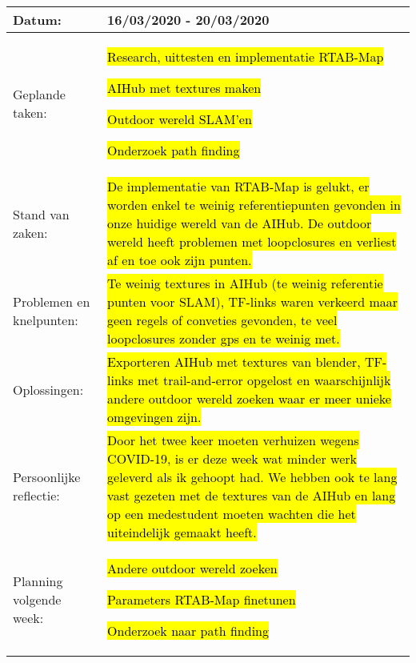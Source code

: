 \begin{tabularx}{\textwidth}{| l | X |}
  \hline
  Datum: & 16/03/2020 - 20/03/2020\\
  \hline
  Geplande taken: &
  \begin{compactitem}
    \item \hl{Research, uittesten en implementatie RTAB-Map}
    \item \hl{AIHub met textures maken}
    \item \hl{Outdoor wereld SLAM'en}
    \item \hl{Onderzoek path finding}
  \end{compactitem}\\
  \hline
  Stand van zaken: & \hl{De implementatie van RTAB-Map is gelukt, er worden enkel te weinig referentiepunten gevonden in onze huidige wereld van de AIHub. De outdoor wereld heeft problemen met loopclosures en verliest af en toe ook zijn punten.}\\
  \hline
  Problemen en knelpunten: & \hl{Te weinig textures in AIHub (te weinig referentie punten voor SLAM), TF-links waren verkeerd maar geen regels of conveties gevonden, te veel loopclosures zonder gps en te weinig met.}\\
  \hline
  Oplossingen: & \hl{Exporteren AIHub met textures van blender, TF-links met trail-and-error opgelost en waarschijnlijk andere outdoor wereld zoeken waar er meer unieke omgevingen zijn.}\\
  \hline
  Persoonlijke reflectie: & \hl{Door het twee keer moeten verhuizen wegens COVID-19, is er deze week wat minder werk geleverd als ik gehoopt had. We hebben ook te lang vast gezeten met de textures van de AIHub en lang op een medestudent moeten wachten die het uiteindelijk gemaakt heeft.}\\
  \hline
  Planning volgende week: &
  \begin{compactitem}
    \item \hl{Andere outdoor wereld zoeken}
    \item \hl{Parameters RTAB-Map finetunen}
    \item \hl{Onderzoek naar path finding}
  \end{compactitem}\\
  \hline
\end{tabularx}